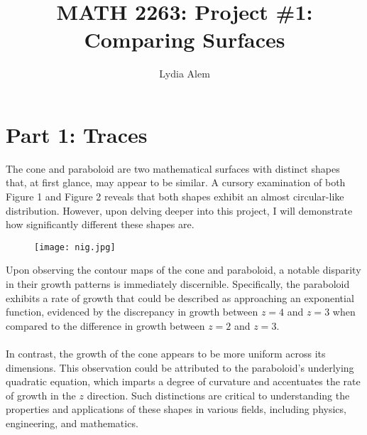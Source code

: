 \documentclass[english]{article}
\begin{document}
\title{MATH 2263: Project \#1: Comparing Surfaces}

\author{
Lydia Alem
}

\maketitle

\section{Part 1: Traces}\label{introduction}
    The cone and paraboloid are two mathematical surfaces with distinct shapes that, at first glance, may appear to be similar. A cursory examination of both Figure 1 and Figure 2 reveals that both shapes exhibit an almost circular-like distribution. However, upon delving deeper into this project, I will demonstrate how significantly different these shapes are. 
    
    \begin{figure}[H]
    	\begin{centering}
      		\texttt{[image: nig.jpg]}
    	\end{centering}
    \end{figure}

    
    

    Upon observing the contour maps of the cone and paraboloid, a notable disparity in their growth patterns is immediately discernible. Specifically, the paraboloid exhibits a rate of growth that could be described as approaching an exponential function, evidenced by the discrepancy in growth between $z = 4$ and $z = 3$ when compared to the difference in growth between $z = 2$ and $z = 3$. 
    \\
    \\
    In contrast, the growth of the cone appears to be more uniform across its dimensions.
    This observation could be attributed to the paraboloid's underlying quadratic equation, which imparts a degree of curvature and accentuates the rate of growth in the $z$ direction. Such distinctions are critical to understanding the properties and applications of these shapes in various fields, including physics, engineering, and mathematics.
     
\end{document}
